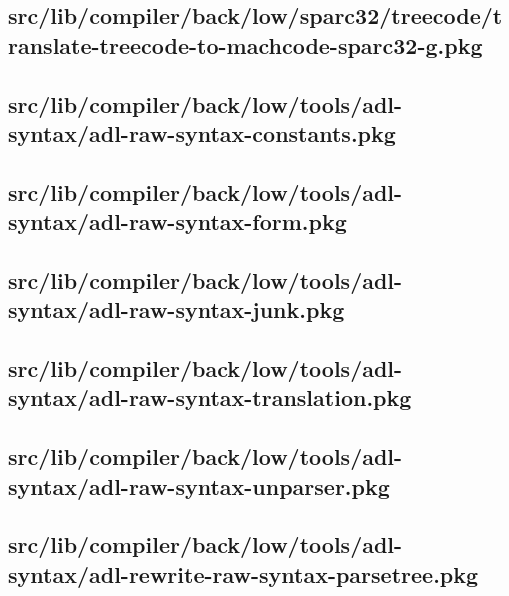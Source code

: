 \subsection{src/lib/compiler/back/low/sparc32/treecode/translate-treecode-to-machcode-sparc32-g.pkg}


\subsection{src/lib/compiler/back/low/tools/adl-syntax/adl-raw-syntax-constants.pkg}


\subsection{src/lib/compiler/back/low/tools/adl-syntax/adl-raw-syntax-form.pkg}


\subsection{src/lib/compiler/back/low/tools/adl-syntax/adl-raw-syntax-junk.pkg}


\subsection{src/lib/compiler/back/low/tools/adl-syntax/adl-raw-syntax-translation.pkg}


\subsection{src/lib/compiler/back/low/tools/adl-syntax/adl-raw-syntax-unparser.pkg}


\subsection{src/lib/compiler/back/low/tools/adl-syntax/adl-rewrite-raw-syntax-parsetree.pkg}


